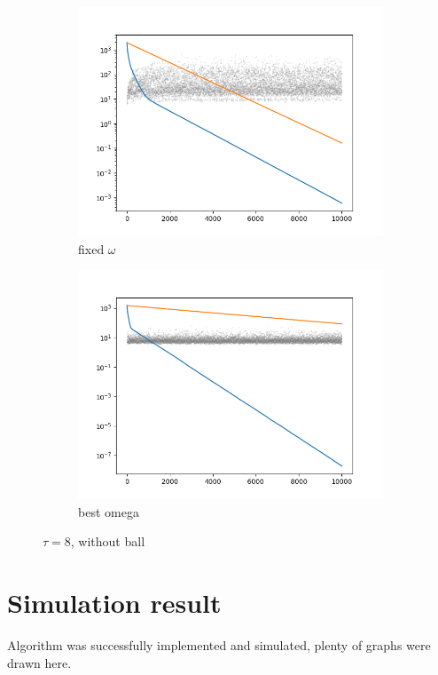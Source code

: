 \documentclass[11pt]{book}
\theoremstyle{definition}
\begin{document}
\begin{figure}[H]
		\centering
		\begin{subfigure}{.5\textwidth}
			\centering
			\includegraphics[width=.8\linewidth]{f8n.png}
			\caption{fixed $\omega$}
			\label{fig:sub11}
		\end{subfigure}%
		\begin{subfigure}{.5\textwidth}
			\centering
			\includegraphics[width=.8\linewidth]{b8n.png}
			\caption{best omega}
			\label{fig:sub12}
		\end{subfigure}
		\caption{$\tau=8$, without ball}
		\label{fig:test6}
	\end{figure}
	
	\newpage
	
	\section{Simulation result}
	
	Algorithm was successfully implemented and simulated, plenty of graphs were drawn here.\\
	
\end{document}
